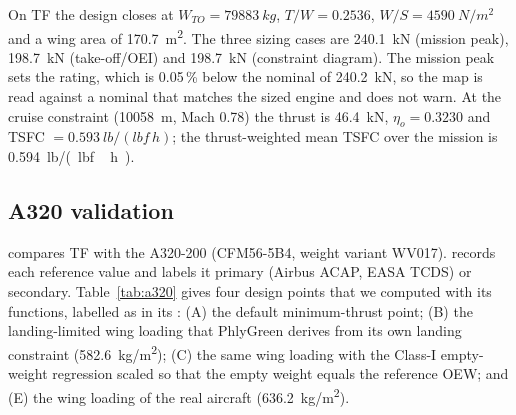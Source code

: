 \documentclass[a4paper,11pt]{article}
\newcommand{\etao}{\eta_{o}}
\begin{document}
On TF the design closes at $W_{TO} = \SI{79883}{kg}$, $T/W = 0.2536$, $W/S =
\SI{4590}{N/m^2}$ and a wing area of \SI{170.7}{m^2}. The three sizing cases are
\SI{240.1}{kN} (mission peak), \SI{198.7}{kN} (take-off/OEI) and \SI{198.7}{kN} (constraint
diagram). The mission peak sets the rating, which is 0.05\,\% below the nominal of
\SI{240.2}{kN}, so the map is read against a nominal that matches the sized engine and
 does not warn. At the cruise constraint (\SI{10058}{m}, Mach
0.78) the thrust is \SI{46.4}{kN}, $\etao = 0.3230$ and TSFC $= \SI{0.593}{lb/(lbf\,h)}$; the
thrust-weighted mean TSFC over the mission is \SI{0.594}{lb/(lbf\,h)}.

\subsection{A320 validation}\label{sec:a320}
 compares TF with the A320-200 (CFM56-5B4, weight
variant WV017).  records each reference value and labels it primary
(Airbus ACAP, EASA TCDS) or secondary. Table~\ref{tab:a320} gives four design points that we
computed with its functions, labelled as in its : (A) the default minimum-thrust
point; (B) the landing-limited wing loading that PhlyGreen derives from its own landing
constraint (\SI{582.6}{kg/m^2}); (C) the same wing loading with the Class-I empty-weight
regression scaled so that the empty weight equals the reference OEW; and (E) the wing loading of
the real aircraft (\SI{636.2}{kg/m^2}).
\end{document}
